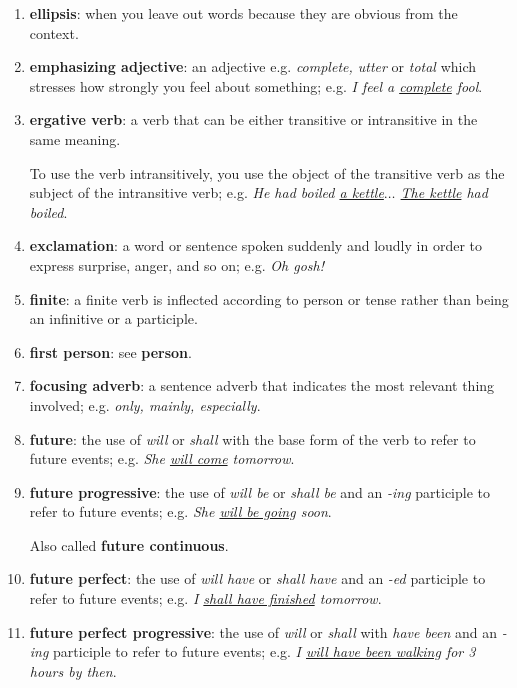 \documentclass[oneside]{book}
\numberwithin{equation}{section}
\begin{document}
\begin{enumerate}
    Irregular participles e.g. \textit{given} and \textit{broken} are also called \textit{-ed} participles because they behave like regular \textit{-ed} participles.
    
    Also called \textbf{past participle}.
    \item \textbf{ellipsis}: when you leave out words because they are obvious from the context.
    \item \textbf{emphasizing adjective}: an adjective e.g. \textit{complete, utter} or \textit{total} which stresses how strongly you feel about something; e.g. \textit{I feel a \underline{complete} fool}.
    \item \textbf{ergative verb}: a verb that can be either transitive or intransitive in the same meaning.
    
    To use the verb intransitively, you use the object of the transitive verb as the subject of the intransitive verb; e.g. \textit{He had boiled \underline{a kettle}$\ldots$ \underline{The kettle} had boiled}.
    \item \textbf{exclamation}: a word or sentence spoken suddenly and loudly in order to express surprise, anger, and so on; e.g. \textit{Oh gosh!}
    \item \textbf{finite}: a finite verb is inflected according to person or tense rather than being an infinitive or a participle.
    \item \textbf{first person}: see \textbf{person}.
    \item \textbf{focusing adverb}: a sentence adverb that indicates the most relevant thing involved; e.g. \textit{only, mainly, especially}.
    \item \textbf{future}: the use of \textit{will} or \textit{shall} with the base form of the verb to refer to future events; e.g. \textit{She \underline{will come} tomorrow}.
    \item \textbf{future progressive}: the use of \textit{will be} or \textit{shall be} and an \textit{-ing} participle to refer to future events; e.g. \textit{She \underline{will be going} soon}.
    
    Also called \textbf{future continuous}.
    \item \textbf{future perfect}: the use of \textit{will have} or \textit{shall have} and an \textit{-ed} participle to refer to future events; e.g. \textit{I \underline{shall have finished} tomorrow}.
    \item \textbf{future perfect progressive}: the use of \textit{will} or \textit{shall} with \textit{have been} and an \textit{-ing} participle to refer to future events; e.g. \textit{I \underline{will have been walking} for 3 hours by then}.
    

\end{enumerate}
\end{document}
